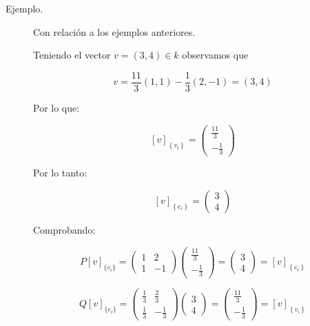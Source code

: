 \documentclass[12pt]{article}
\begin{document}
\begin{description}
	\item [Ejemplo.] Con relación a los ejemplos anteriores.

	Teniendo el vector $v = (3, 4) \in k$ observamos que

	\begin{equation}
		v = \frac{11}{3} (1, 1) - \frac{1}{3} (2, -1) = (3, 4) \nonumber
	\end{equation}

	Por lo que:

	\begin{equation}
		\left[ v \right]_{\left\{ v_i \right\}} =
		\begin{pmatrix}
			\frac{11}{3} \\
			-\frac{1}{3}
		\end{pmatrix}
		\nonumber
	\end{equation}

	Por lo tanto:

	\begin{equation}
		\left[ v \right]_{\left\{ e_i \right\}} =
		\begin{pmatrix}
			3 \\
			4
		\end{pmatrix}
		\nonumber
	\end{equation}

	Comprobando:

	\begin{equation}
		P \left[ v \right]_{\{ v_i \}} =
		\begin{pmatrix}
			1 & 2 \\
			1 & -1 
		\end{pmatrix}
		\begin{pmatrix}
			\frac{11}{3} \\
			-\frac{1}{3}
		\end{pmatrix} =
		\begin{pmatrix}
			3 \\
			4
		\end{pmatrix} =
		\left[ v \right]_{\left\{ e_i \right\}}
		\nonumber
	\end{equation}

	\begin{equation}
		Q \left[ v \right]_{\{ e_i \}} =
		\begin{pmatrix}
			\frac{1}{3} & \frac{2}{3} \\
			\frac{1}{3} & -\frac{1}{3}
		\end{pmatrix}
		\begin{pmatrix}
			3 \\
			4
		\end{pmatrix} =
		\begin{pmatrix}
			\frac{11}{3} \\
			-\frac{1}{3}
		\end{pmatrix} =
		\left[ v \right]_{\left\{ v_i \right\}}
		\nonumber
	\end{equation}
\end{description}
\end{document}
